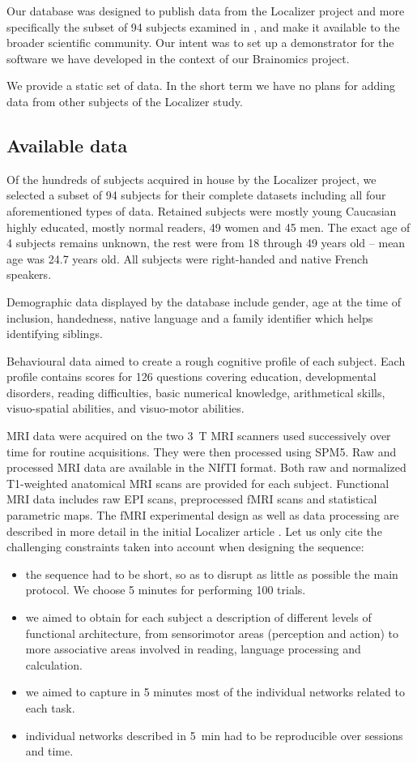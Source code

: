 \documentclass[review]{elsarticle}
\begin{document}
Our database was designed to publish data from the Localizer project \cite{Pinel2007} and more specifically the subset of 94 subjects examined in \cite{Pinel2012}, and make it available to the broader scientific community. Our intent was to set up a demonstrator for the software we have developed in the context of our Brainomics project.

We provide a static set of data. In the short term we have no plans for adding data from other subjects of the Localizer study.


\subsection{Available data}

Of the hundreds of subjects acquired in house by the Localizer project, we selected a subset of 94 subjects for their complete datasets \cite{Pinel2012} including all four aforementioned types of data. Retained subjects were mostly young Caucasian highly educated, mostly normal readers, 49 women and 45 men. The exact age of 4 subjects remains unknown, the rest were from 18 through 49 years old -- mean age was 24.7 years old. All subjects were right-handed and native French speakers.

Demographic data displayed by the database include gender, age at the time of inclusion, handedness, native language and a family identifier which helps identifying siblings.

Behavioural data aimed to create a rough cognitive profile of each subject. Each profile contains scores for 126 questions covering education, developmental disorders, reading difficulties, basic numerical knowledge, arithmetical skills, visuo-spatial abilities, and visuo-motor abilities.

MRI data were acquired on the two 3~T MRI scanners used successively over time for routine acquisitions. They were then processed using SPM5. Raw and processed MRI data are available in the NIfTI format. Both raw and normalized T1-weighted anatomical MRI scans are provided for each subject. Functional MRI data includes raw EPI scans, preprocessed fMRI scans and statistical parametric maps. The fMRI experimental design as well as data processing are described in more detail in the initial Localizer article \cite{Pinel2007}. Let us only cite the challenging constraints taken into account when designing the sequence:
\begin{itemize}
\item the sequence had to be short, so as to disrupt as little as possible the main protocol. We choose 5 minutes for performing 100 trials.
\item we aimed to obtain for each subject a description of different levels of functional architecture, from sensorimotor areas (perception and action) to more associative areas involved in reading, language processing and calculation.
\item we aimed to capture in 5 minutes most of the individual networks related to each task.
\item individual networks described in 5~min had to be reproducible over sessions and time.
\end{itemize}
\end{document}
